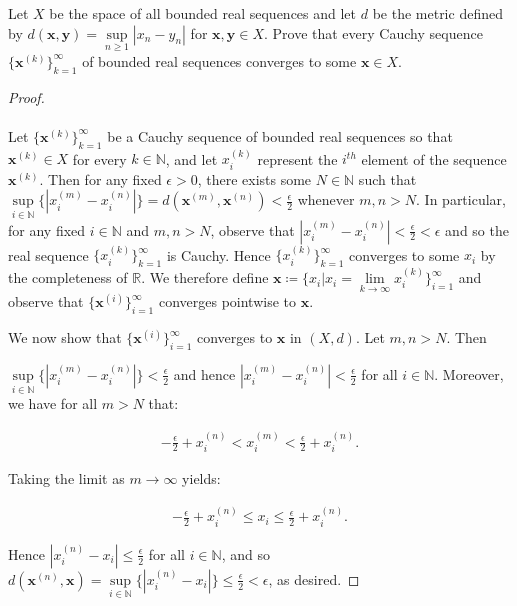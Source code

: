 Let $X$ be the space of all bounded real sequences and let $d$ be the metric
defined by $d(\textbf{x}, \textbf{y}) = \sup\limits_{n \ge 1}{|x_n - y_n|}$
for $\textbf{x}, \textbf{y} \in X$. Prove that every Cauchy sequence 
$\{\textbf{x}^{(k)}\}_{k=1}^{\infty}$ of bounded real sequences converges to some $\textbf{x} \in X$.


\begin{proof}\ \\\\
 Let $\{\textbf{x}^{(k)}\}_{k=1}^{\infty}$ be a Cauchy sequence of bounded real sequences so that
 $\textbf{x}^{(k)} \in X$ for every $k \in \mathbb{N}$, and let $x_i^{(k)}$ represent the $i^{th}$ element of
 the sequence $\textbf{x}^{(k)}$. Then for any fixed $\epsilon > 0$, there exists some 
 $N \in \mathbb{N}$ such that
 $\sup\limits_{i \in \mathbb{N}}{\{|x_i^{(m)} - x_i^{(n)}|\}} = d(\textbf{x}^{(m)}, \textbf{x}^{(n)}) < \frac{\epsilon}{2}$
 whenever $m, n > N$. In particular, for any fixed $i \in \mathbb{N}$ and $m, n > N$, observe that
 $|x_i^{(m)} - x_i^{(n)}| < \frac{\epsilon}{2} < \epsilon$ and so the real sequence
 $\{x_i^{(k)}\}_{k=1}^{\infty}$ is Cauchy. Hence $\{x_i^{(k)}\}_{k=1}^{\infty}$ converges to some $x_i$ by the completeness of 
 $\mathbb{R}$. We therefore define
 $\textbf{x} \coloneqq \{x_i \vert x_i=\lim\limits_{k \to \infty}{x_i^{(k)}}\}_{i=1}^{\infty}$ and observe that
 $\{\textbf{x}^{(i)}\}_{i=1}^{\infty}$ converges pointwise to $\textbf{x}$.
 
 We now show that
 $\{\textbf{x}^{(i)}\}_{i=1}^{\infty}$ converges to $\textbf{x}$ in $(X, d)$. Let $m, n > N$. Then

 $\sup\limits_{i \in \mathbb{N}}{\{|x_i^{(m)} - x_i^{(n)}|\}} < \frac{\epsilon}{2}$ and hence
 $|x_i^{(m)} - x_i^{(n)}| < \frac{\epsilon}{2}$ for all $i \in \mathbb{N}$. Moreover, we have for all $m > N$ that:

 \begin{align*}
    -\frac{\epsilon}{2} + x_i^{(n)} < x_i^{(m)} < \frac{\epsilon}{2} + x_i^{(n)}.
 \end{align*}

 Taking the limit as $m \to \infty$ yields:

 \begin{align*}
    -\frac{\epsilon}{2} + x_i^{(n)} \le x_i \le \frac{\epsilon}{2} + x_i^{(n)}.
 \end{align*}

 Hence $|x_i^{(n)} - x_i| \le \frac{\epsilon}{2}$ for all $i \in \mathbb{N}$, and so 
 $d(\textbf{x}^{(n)}, \textbf{x}) = \sup\limits_{i \in \mathbb{N}}{\{|x_i^{(n)} - x_i|\}} \le \frac{\epsilon}{2} < \epsilon$,
 as desired.


\end{proof}
